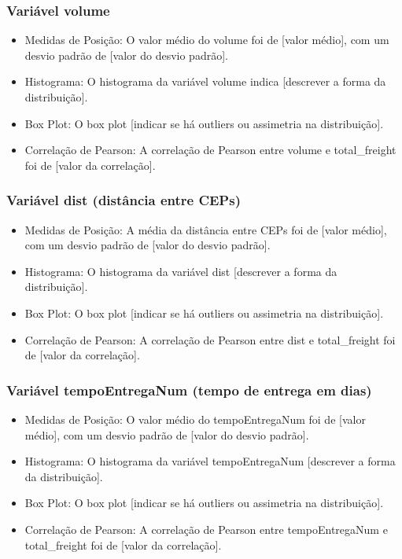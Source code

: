 \documentclass[
]{article}
\begin{document}
\hypertarget{variuxe1vel-volume}{%
\subsubsection{Variável volume}\label{variuxe1vel-volume}}

\begin{itemize}
\item
  Medidas de Posição: O valor médio do volume foi de {[}valor médio{]},
  com um desvio padrão de {[}valor do desvio padrão{]}.
\item
  Histograma: O histograma da variável volume indica {[}descrever a
  forma da distribuição{]}.
\item
  Box Plot: O box plot {[}indicar se há outliers ou assimetria na
  distribuição{]}.
\item
  Correlação de Pearson: A correlação de Pearson entre volume e
  total\_freight foi de {[}valor da correlação{]}.
\end{itemize}

\hypertarget{variuxe1vel-dist-distuxe2ncia-entre-ceps}{%
\subsubsection{Variável dist (distância entre
CEPs)}\label{variuxe1vel-dist-distuxe2ncia-entre-ceps}}

\begin{itemize}
\item
  Medidas de Posição: A média da distância entre CEPs foi de {[}valor
  médio{]}, com um desvio padrão de {[}valor do desvio padrão{]}.
\item
  Histograma: O histograma da variável dist {[}descrever a forma da
  distribuição{]}.
\item
  Box Plot: O box plot {[}indicar se há outliers ou assimetria na
  distribuição{]}.
\item
  Correlação de Pearson: A correlação de Pearson entre dist e
  total\_freight foi de {[}valor da correlação{]}.
\end{itemize}

\hypertarget{variuxe1vel-tempoentreganum-tempo-de-entrega-em-dias}{%
\subsubsection{Variável tempoEntregaNum (tempo de entrega em
dias)}\label{variuxe1vel-tempoentreganum-tempo-de-entrega-em-dias}}

\begin{itemize}
\item
  Medidas de Posição: O valor médio do tempoEntregaNum foi de {[}valor
  médio{]}, com um desvio padrão de {[}valor do desvio padrão{]}.
\item
  Histograma: O histograma da variável tempoEntregaNum {[}descrever a
  forma da distribuição{]}.
\item
  Box Plot: O box plot {[}indicar se há outliers ou assimetria na
  distribuição{]}.
\item
  Correlação de Pearson: A correlação de Pearson entre tempoEntregaNum e
  total\_freight foi de {[}valor da correlação{]}.
\end{itemize}
\end{document}
